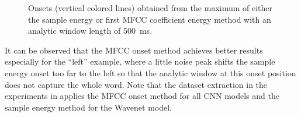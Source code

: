 \begin{figure}[!ht]
  \centering
    \quad
    \quad
  \caption{Onsets (vertical colored lines) obtained from the maximum of either the sample energy or first MFCC coefficient energy method with an analytic window length of \SI{500}{\milli\second}.}
  \label{fig:signal_onset_showcase}
\end{figure}
\FloatBarrier
\noindent
It can be observed that the MFCC onset method achieves better results especially for the \enquote{left} example, where a little noise peak shifts the sample energy onset too far to the left so that the analytic window at this onset position does not capture the whole word.
Note that the dataset extraction in the experiments in  applies the MFCC onset method for all CNN models and the sample energy method for the Wavenet model.


